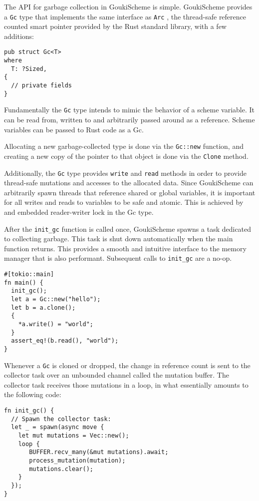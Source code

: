 \documentclass[sigplan]{acmart}
\begin{document}
The API for garbage collection in GoukiScheme is simple. GoukiScheme provides a
\texttt{Gc} type that implements the same interface as \texttt{Arc} \cite{arc},
the thread-safe reference counted smart pointer provided by the Rust standard
library, with a few additions:

\begin{verbatim}
pub struct Gc<T>
where
  T: ?Sized,
{
  // private fields
}
\end{verbatim}

Fundamentally the \texttt{Gc} type intends to mimic the behavior of a scheme variable.
It can be read from,  written to and arbitrarily passed around as a reference. Scheme
variables can be passed to Rust code as a Gc. 

Allocating a new garbage-collected type is done via the \texttt{Gc::new} function, and
creating a new copy of the pointer to that object is done via the \texttt{Clone}
method.

Additionally, the \texttt{Gc} type provides \texttt{write} and \texttt{read}
methods in order to provide thread-safe mutations and accesses to the allocated
data. Since GoukiScheme can arbitrarily spawn threads that reference shared or
global variables, it is important for all writes and reads to variables to be safe
and atomic. This is achieved by and embedded reader-writer lock in the Gc type.

After the \texttt{init\_gc} function is called once, GoukiScheme spawns a task
dedicated to collecting garbage. This task is shut down automatically when the
main function returns. This provides a smooth and intuitive interface to the
memory manager that is also performant. Subsequent calls to \texttt{init\_gc}
are a no-op.

\begin{verbatim}
#[tokio::main]
fn main() {
  init_gc();
  let a = Gc::new("hello");
  let b = a.clone();
  {
    *a.write() = "world";
  }
  assert_eq!(b.read(), "world");
}
\end{verbatim}

Whenever a \texttt{Gc} is cloned or dropped, the change in reference count is
sent to the collector task over an unbounded channel called the mutation buffer.
The collector task receives those mutations in a loop, in what essentially amounts
to the following code:

\vfill\null

\begin{verbatim}
fn init_gc() {
  // Spawn the collector task:
  let _ = spawn(async move {
    let mut mutations = Vec::new();
    loop {
       BUFFER.recv_many(&mut mutations).await;
       process_mutation(mutation);
       mutations.clear();
    } 
  });
}  
\end{verbatim}
\end{document}
